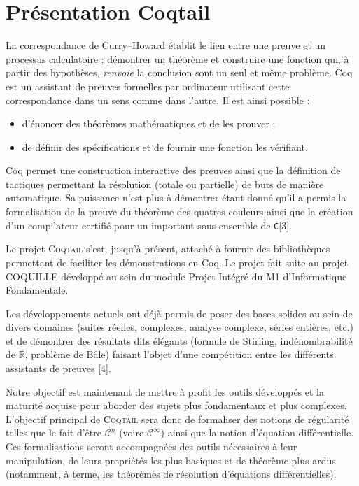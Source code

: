 \documentclass[11pt]{article}
\newcommand{\coqtail}{\textsc{Coqtail}}
\begin{document}
\section{Présentation Coqtail}


La correspondance de Curry--Howard établit le lien entre une preuve et un processus calculatoire : démontrer un théorème et construire une fonction qui, à partir des hypothèses, \emph{renvoie} la conclusion sont un seul et même problème.
Coq\cite{L:BC04} est un assistant de preuves formelles par ordinateur utilisant cette correspondance dans un sens comme dans l'autre. Il est ainsi possible :
\begin{itemize}
  \item d'énoncer des théorèmes mathématiques et de les prouver ;
  \item de définir des spécifications et de fournir une fonction les vérifiant.
\end{itemize}

Coq permet une construction interactive des preuves ainsi que la définition de tactiques permettant la résolution (totale ou partielle) de buts de manière automatique. Sa puissance n'est plus à démontrer étant donné qu'il a permis la formalisation de la preuve du théorème des quatres couleurs\cite{Gonthier07} ainsi que la création d'un compilateur certifié pour un important sous-ensemble de \texttt{C}[3].

Le projet \coqtail{} s'est, jusqu'à présent, attaché à fournir des bibliothèques permettant de faciliter les démonstrations en Coq. Le projet fait suite au projet COQUILLE développé au sein du module Projet Intégré du M1 d'Informatique Fondamentale.

Les développements actuels ont déjà permis de poser des bases solides au sein de divers domaines (suites réelles, complexes, analyse complexe, séries entières, etc.) et de démontrer des résultats dits élégants (formule de Stirling, indénombrabilité de $\mathbb{R}$, problème de Bâle) faisant l'objet d'une compétition entre les différents assistants de preuves [4].


Notre objectif est maintenant de mettre à profit les outils développés et la maturité acquise pour aborder des sujets plus fondamentaux et plus complexes. L'objectif principal de \coqtail{} sera donc de formaliser des notions de régularité telles que le fait d'être $\mathcal{C}^n$ (voire $\mathcal{C}^\infty$) ainsi que la notion d'équation différentielle. Ces formalisations seront accompagnées des outils nécessaires à leur manipulation, de leurs propriétés les plus basiques et de théorème plus ardus (notamment, à terme, les théorèmes de résolution d'équations différentielles).
\end{document}
